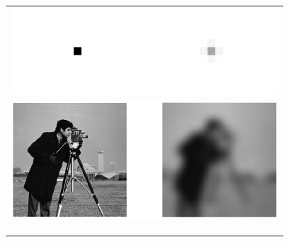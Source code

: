 \documentclass{standalone}
\begin{document}
\begin{tabular}{c}
	\includegraphics[width=10cm]{pix_ges-scaled.png}\\
	\includegraphics[width=10cm]{pic.png}\\
	\\
	\\
	\hspace{0.07cm}\\
\end{tabular}
\end{document}

